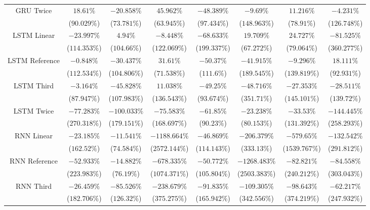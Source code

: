 \begin{table}[!ht]
{\begin{tabular}{|c|c|c|c|c|c|c|c|}
			\multirow{2}{*}{GRU Twice} & $18.61\%$ & $-20.858\%$ & $45.962\%$ & $-48.389\%$ & $-9.69\%$ & $11.216\%$ & $-4.231\%$ \\
			 & ($90.029\%$) & ($73.781\%$) & ($63.945\%$) & ($97.434\%$) & ($148.963\%$) & ($78.91\%$) & ($126.748\%$) \\ \hline
			\multirow{2}{*}{LSTM Linear} & $-23.997\%$ & $4.94\%$ & $-8.448\%$ & $-68.633\%$ & $19.709\%$ & $24.727\%$ & $-81.525\%$ \\
			 & ($114.353\%$) & ($104.66\%$) & ($122.069\%$) & ($199.337\%$) & ($67.272\%$) & ($79.064\%$) & ($360.277\%$) \\ \hline
			\multirow{2}{*}{LSTM Reference} & $-0.848\%$ & $-30.437\%$ & $31.61\%$ & $-50.37\%$ & $-41.915\%$ & $-9.296\%$ & $18.111\%$ \\
			 & ($112.534\%$) & ($104.806\%$) & ($71.538\%$) & ($111.6\%$) & ($189.545\%$) & ($139.819\%$) & ($92.931\%$) \\ \hline
			\multirow{2}{*}{LSTM Third} & $-3.164\%$ & $-45.828\%$ & $11.038\%$ & $-49.25\%$ & $-48.716\%$ & $-27.353\%$ & $-28.511\%$ \\
			 & ($87.947\%$) & ($107.983\%$) & ($136.543\%$) & ($93.674\%$) & ($351.71\%$) & ($145.101\%$) & ($139.72\%$) \\ \hline
			\multirow{2}{*}{LSTM Twice} & $-77.283\%$ & $-100.033\%$ & $-75.583\%$ & $-61.85\%$ & $-23.238\%$ & $-33.53\%$ & $-144.445\%$ \\
			 & ($270.318\%$) & ($179.151\%$) & ($168.697\%$) & ($90.23\%$) & ($80.153\%$) & ($131.392\%$) & ($258.293\%$) \\ \hline
			\multirow{2}{*}{RNN Linear} & $-23.185\%$ & $-11.541\%$ & $-1188.664\%$ & $-46.869\%$ & $-206.379\%$ & $-579.65\%$ & $-132.542\%$ \\
			 & ($162.52\%$) & ($74.584\%$) & ($2572.144\%$) & ($114.143\%$) & ($333.13\%$) & ($1539.767\%$) & ($291.812\%$) \\ \hline
			\multirow{2}{*}{RNN Reference} & $-52.933\%$ & $-14.882\%$ & $-678.335\%$ & $-50.772\%$ & $-1268.483\%$ & $-82.821\%$ & $-84.558\%$ \\
			 & ($223.983\%$) & ($76.19\%$) & ($1074.371\%$) & ($105.804\%$) & ($2503.383\%$) & ($240.212\%$) & ($303.043\%$) \\ \hline
			\multirow{2}{*}{RNN Third} & $-26.459\%$ & $-85.526\%$ & $-238.679\%$ & $-91.835\%$ & $-109.305\%$ & $-98.643\%$ & $-62.217\%$ \\
			 & ($182.706\%$) & ($126.32\%$) & ($375.275\%$) & ($165.942\%$) & ($342.556\%$) & ($374.219\%$) & ($247.932\%$) \\ \hline

\end{tabular}}
\end{table}
